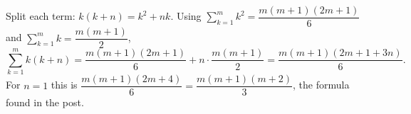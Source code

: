 Split each term: $k(k+n)=k^2+nk$. Using $\displaystyle\sum_{k=1}^mk^2=\dfrac{m(m+1)(2m+1)}{6}$ and $\displaystyle\sum_{k=1}^mk=\dfrac{m(m+1)}{2}$,
\[
\sum_{k=1}^mk(k+n)=\dfrac{m(m+1)(2m+1)}{6}+n\cdot\dfrac{m(m+1)}{2}=\boxed{\dfrac{m(m+1)(2m+1+3n)}{6}} .
\]
For $n=1$ this is $\dfrac{m(m+1)(2m+4)}{6}=\dfrac{m(m+1)(m+2)}{3}$, the formula found in the post.
